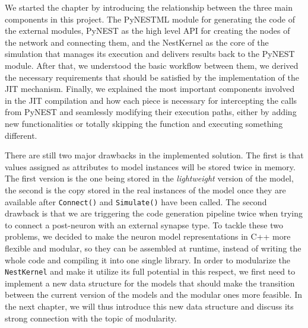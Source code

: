 We started the chapter by introducing the relationship between the three main components in this project. The PyNESTML module for generating the code of the external modules, PyNEST as the high level API for creating the nodes of the network and connecting them, and the NestKernel as the core of the simulation that manages its execution and delivers results back to the PyNEST module. After that, we understood the basic workflow between them, we derived the necessary requirements that should be satisfied by the implementation of the JIT mechanism. Finally, we explained the most important components involved in the JIT compilation and how each piece is necessary for intercepting the calls from PyNEST and seamlessly modifying their execution paths, either by adding new functionalities or totally skipping the function and executing something different.

There are still two major drawbacks in the implemented solution. The first is that values assigned as attributes to model instances will be stored twice in memory. The first version is the one being stored in the \emph{lightweight} version of the model, the second is the copy stored in the real instances of the model once they are available after \texttt{Connect()} and \texttt{Simulate()} have been called. The second drawback is that we are triggering the code generation pipeline twice when trying to connect a post-neuron with an external synapse type. To tackle these two problems, we decided to make the neuron model representations in C++ more flexible and modular, so they can be assembled at runtime, instead of writing the whole code and compiling it into one single library. In order to modularize the \texttt{NestKernel} and make it utilize its full potential in this respect, we first need to implement a new data structure for the models that should make the transition between the current version of the models and the modular ones more feasible. In the next chapter, we will thus introduce this new data structure and discuss its strong connection with the topic of modularity.

\cleardoublepage
